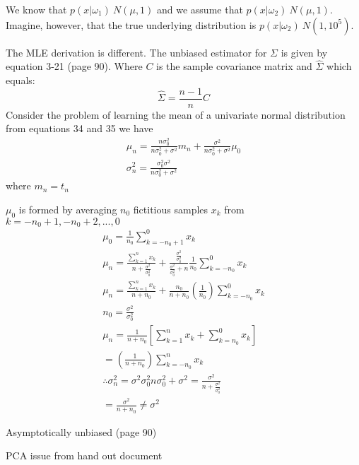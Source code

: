 \documentclass[11pt]{article}
\begin{document}
We know that $p(x| \omega_1) ~ N(\mu, 1)$ and we assume that $p(x| \omega_2) ~N(\mu, 1)$.  Imagine, however, that the true underlying distribution is $p(x | \omega_2) ~ N(1, 10^5)$.  


The MLE derivation is different.  The unbiased estimator for $\Sigma$ is given by equation 3-21 (page 90).  Where $C$ is the sample covariance matrix and $\hat{\Sigma}$ which equals:
\[
\hat{\Sigma} = \frac{n-1}{n}C 
\]
Consider the problem of learning the mean of a univariate normal distribution from equations 34 and 35 we have
\begin{eqnarray}
	\mu _n = \frac{n \sigma_0 ^2} {n \sigma_0 ^2 + \sigma^2} m_n + \frac{\sigma^2}{n \sigma_0 ^2 + \sigma^2} \mu_0\\
	\sigma_n ^2 = \frac{ \sigma_0 ^2 \sigma^2 }{ n \sigma_0 ^2 + \sigma^2}
\end{eqnarray}
where $m_n = t_n $

$\mu_0$ is formed by averaging $n_0$ fictitious samples $x_k$ from $k= -n_0 + 1 , -n_0 +2 , ..., 0$
\begin{eqnarray}
\mu _0 = \frac{1}{n_0} \sum _{k =-n_0 + 1}^{0} x_k \\
\mu_n = \frac{ \sum_{k=1}^{n} x_k }{ n + \frac{\sigma^2}{\sigma_0 ^2}} + \frac{ \frac{\sigma^2}{\sigma_0^2}}{\frac{\sigma^2}{\sigma_0 ^2} +n} \frac{1}{n_0} \sum _{k=-n_0} ^0 x_k \\
\mu _n =\frac { \sum_{k=1}^{n} x_k }{n+n_0} + \frac{n_0}{n+n_0} (\frac{1}{n_0})\sum_{k=-n_0} ^0 x_k \\
n_0 = \frac{\sigma^2} {\sigma_0 ^2} \\
\mu _n = \frac{1}{n+ n_0} [ \sum_{k=1}^n x_k + \sum _{k=n_0} ^0 x_k] \\
=  (\frac{1}{n+ n_0}) \sum_{k= -n_0} ^ n x_k \\
\therefore \sigma_n^2 = {\sigma^2 \sigma_0^2}{n \sigma_0 ^2 + \sigma^2} = \frac{\sigma^2} {n + \frac{\sigma^2}{\sigma_0^2}} \\
= \frac{\sigma^2} {n+ n_0} \neq \sigma^2 
\end{eqnarray}

Asymptotically unbiased  (page 90)


PCA issue from hand out document




\end{document}

